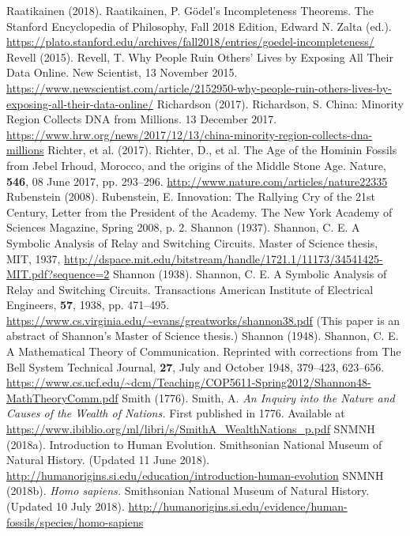 \begin{multicols}{2}
\begin{thebibliography}{99}
 Raatikainen (2018). Raatikainen, P. Gödel’s Incompleteness Theorems. The Stanford Encyclopedia of Philosophy, Fall 2018 Edition, Edward N. Zalta (ed.). \url{https://plato.stanford.edu/archives/fall2018/entries/goedel-incompleteness/}
 Revell (2015). Revell, T. Why People Ruin Others’ Lives by Exposing All Their Data Online. New Scientist, 13 November 2015. \url{https://www.newscientist.com/article/2152950-why-people-ruin-others-lives-by-exposing-all-their-data-online/}
 Richardson (2017). Richardson, S. China: Minority Region Collects DNA from Millions. 13 December 2017. \url{https://www.hrw.org/news/2017/12/13/china-minority-region-collects-dna-millions}
 Richter, et al. (2017). Richter, D., et al. The Age of the Hominin Fossils from Jebel Irhoud, Morocco, and the origins of the Middle Stone Age. Nature, \textbf{546}, 08 June 2017, pp. 293--296. \url{http://www.nature.com/articles/nature22335}
 Rubenstein (2008). Rubenstein, E. Innovation: The Rallying Cry of the 21st Century, Letter from the President of the Academy. The New York Academy of Sciences Magazine, Spring 2008, p. 2.
 Shannon (1937). Shannon, C. E. A Symbolic Analysis of Relay and Switching Circuits. Master of Science thesis, MIT, 1937, \url{http://dspace.mit.edu/bitstream/handle/1721.1/11173/34541425-MIT.pdf?sequence=2}
 Shannon (1938). Shannon, C. E. A Symbolic Analysis of Relay and Switching Circuits. Transactions American Institute of Electrical Engineers, \textbf{57}, 1938, pp. 471--495. \url{https://www.cs.virginia.edu/~evans/greatworks/shannon38.pdf} (This paper is an abstract of Shannon’s Master of Science thesis.)
 Shannon (1948). Shannon, C. E. A Mathematical Theory of Communication. Reprinted with corrections from The Bell System Technical Journal, \textbf{27}, July and October 1948, 379–423, 623–656. \url{https://www.cs.ucf.edu/~dcm/Teaching/COP5611-Spring2012/Shannon48-MathTheoryComm.pdf}
 Smith (1776). Smith, A. \textit{An Inquiry into the Nature and Causes of the Wealth of Nations.} First published in 1776. Available at \url{https://www.ibiblio.org/ml/libri/s/SmithA_WealthNations_p.pdf}
 SNMNH (2018a). Introduction to Human Evolution. Smithsonian National Museum of Natural History. (Updated 11 June 2018). \url{http://humanorigins.si.edu/education/introduction-human-evolution}
 SNMNH (2018b). \textit{Homo sapiens.} Smithsonian National Museum of Natural History. (Updated 10 July 2018). \url{http://humanorigins.si.edu/evidence/human-fossils/species/homo-sapiens}

\end{thebibliography}
\end{multicols}
